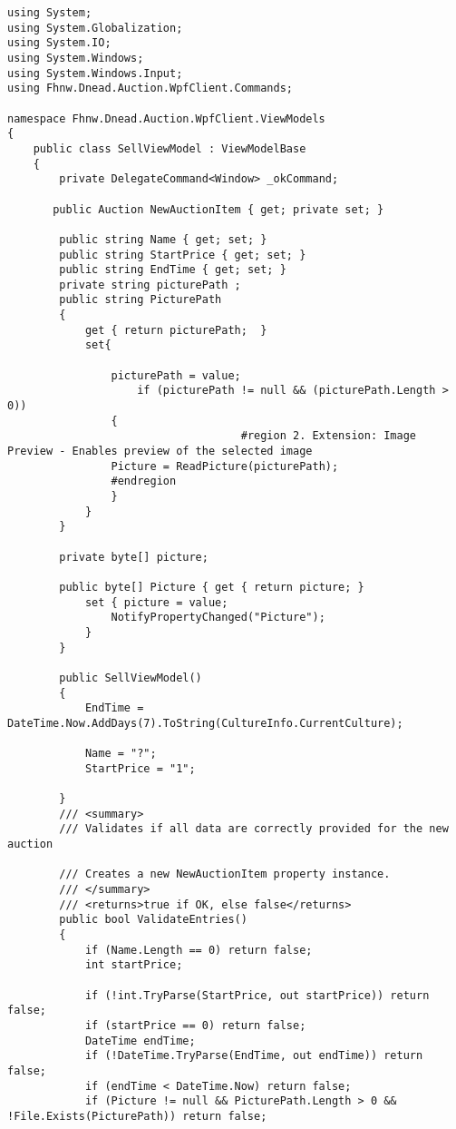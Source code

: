 \documentclass[a4paper,10pt]{scrreprt}
\begin{document}
\begin{lstlisting}[caption=ViewModel/Business logic]
 using System;
using System.Globalization;
using System.IO;
using System.Windows;
using System.Windows.Input;
using Fhnw.Dnead.Auction.WpfClient.Commands;

namespace Fhnw.Dnead.Auction.WpfClient.ViewModels
{
    public class SellViewModel : ViewModelBase
    {
        private DelegateCommand<Window> _okCommand;

       public Auction NewAuctionItem { get; private set; }

        public string Name { get; set; }
        public string StartPrice { get; set; }
        public string EndTime { get; set; }
        private string picturePath ;
        public string PicturePath
        {
            get { return picturePath;  }
            set{
            
                picturePath = value;
                    if (picturePath != null && (picturePath.Length > 0))
                {
                                    #region 2. Extension: Image Preview - Enables preview of the selected image
                Picture = ReadPicture(picturePath);
                #endregion
                }
            }
        }

        private byte[] picture;

        public byte[] Picture { get { return picture; }
            set { picture = value;
                NotifyPropertyChanged("Picture");
            }
        }

        public SellViewModel()
        {
            EndTime = DateTime.Now.AddDays(7).ToString(CultureInfo.CurrentCulture);

            Name = "?";
            StartPrice = "1";
            
        }
        /// <summary>
        /// Validates if all data are correctly provided for the new auction

        /// Creates a new NewAuctionItem property instance.
        /// </summary>
        /// <returns>true if OK, else false</returns>
        public bool ValidateEntries()
        {
            if (Name.Length == 0) return false;
            int startPrice;

            if (!int.TryParse(StartPrice, out startPrice)) return false;
            if (startPrice == 0) return false;
            DateTime endTime;
            if (!DateTime.TryParse(EndTime, out endTime)) return false;
            if (endTime < DateTime.Now) return false;
            if (Picture != null && PicturePath.Length > 0 && !File.Exists(PicturePath)) return false;


\end{lstlisting}
\end{document}
